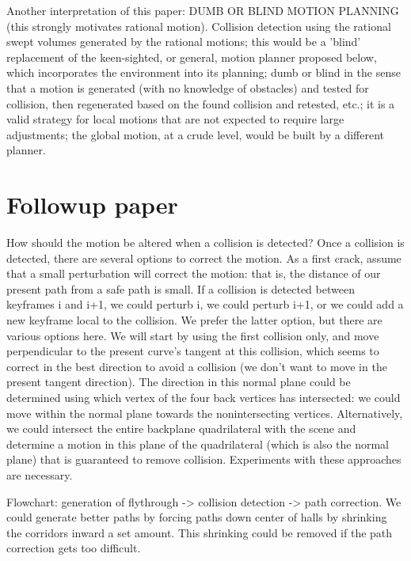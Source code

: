 \documentclass[12pt]{article}
\begin{document}
Another interpretation of this paper: DUMB OR BLIND MOTION PLANNING (this 
strongly motivates rational motion).
Collision detection using the rational swept volumes generated by the rational motions;
this would be a 'blind' replacement of the keen-sighted, or general, motion planner 
proposed below, which incorporates the environment into its planning;
dumb or blind in the sense that a motion is generated (with no knowledge of obstacles)
and tested for collision, then regenerated
based on the found collision and retested, etc.;  it is a valid strategy for local
motions that are not expected to require large adjustments; the global motion, at a
crude level, would be built by a different planner.

\section{Followup paper}

How should the motion be altered when a collision is detected?
Once a collision is detected, there are several options to correct the motion.
As a first crack, assume that a small perturbation will correct the motion:
that is, the distance of our present path from a safe path is small.
If a collision is detected between keyframes i and i+1, we could perturb i,
we could perturb i+1, or we could add a new keyframe local to the collision.
We prefer the latter option, but there are various options here.
We will start by using the first collision only, and move perpendicular to the
present curve's tangent at this collision, which seems to correct in the best
direction to avoid a collision (we don't want to move in the present tangent direction).
The direction in this normal plane could be determined using which vertex of the four
back vertices has intersected: we could move within the normal plane 
towards the nonintersecting vertices.  
Alternatively, we could intersect the entire backplane quadrilateral with the scene
and determine a motion in this plane of the quadrilateral (which is also the normal plane)
that is guaranteed to remove collision.
Experiments with these approaches are necessary.

Flowchart: generation of flythrough -> collision detection -> path correction.
We could generate better paths by forcing paths down center of halls by shrinking
the corridors inward a set amount.  This shrinking could be removed if the path
correction gets too difficult.
\end{document}
